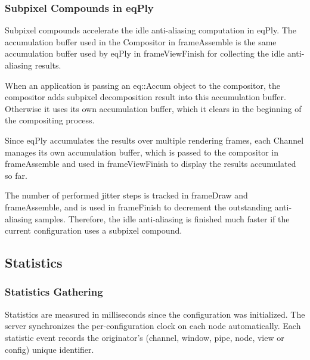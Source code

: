 \documentclass[10pt,a4]{scrartcl}
\begin{document}
\subsubsection{Subpixel Compounds in eqPly}

Subpixel compounds accelerate the idle anti-aliasing computation in eqPly. The
accumulation buffer used in the \textsf{Compositor} in \textsf{frameAssemble} is
the same accumulation buffer used by eqPly in \textsf{frameViewFinish} for
collecting the idle anti-aliasing results.

When an application is passing an \textsf{eq::Accum} object to the compositor,
the compositor adds subpixel decomposition result into this accumulation
buffer. Otherwise it uses its own accumulation buffer, which it clears in the
beginning of the compositing process.

Since \textsf{eqPly} accumulates the results over multiple rendering frames,
each \textsf{Channel} manages its own accumulation buffer, which is passed to
the compositor in \textsf{frameAssemble} and used in \textsf{frameViewFinish} to
display the results accumulated so far.

The number of performed jitter steps is tracked in \textsf{frameDraw} and
\textsf{frameAssemble}, and is used in \textsf{frameFinish} to decrement the
outstanding anti-aliasing samples. Therefore, the idle anti-aliasing is finished
much faster if the current configuration uses a subpixel compound.

\subsection{\label{sStatistics}Statistics}

\subsubsection{Statistics Gathering}

Statistics are measured in milliseconds since the configuration was
initialized. The server synchronizes the per-configuration clock on each node
automatically. Each statistic event records the originator's (channel, window,
pipe, node, view or config) unique identifier.
\end{document}
